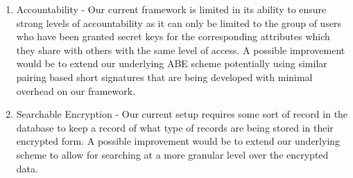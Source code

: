 \begin{enumerate}[label=(\arabic*)]
	\item Accountability - Our current framework is limited in its ability to ensure strong levels of accountability as it can only be limited to the group of users who have been granted secret keys for the corresponding attributes which they share with others with the same level of access. A possible improvement would be to extend our underlying ABE scheme potentially using similar pairing based short signatures that are being developed with minimal overhead on our framework.
	
	\item Searchable Encryption - Our current setup requires some sort of record in the database to keep a record of what type of records are being stored in their encrypted form. A possible improvement would be to extend our underlying scheme to allow for searching at a more granular level over the encrypted data.
	
\end{enumerate}
